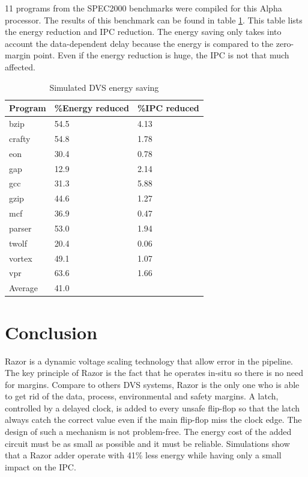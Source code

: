 \documentclass[fleqn,envcountsame,runningheads,10pt,a4paper]{llncs}
\begin{document}
11 programs from the SPEC2000 benchmarks were compiled for this Alpha processor. The results of this benchmark can be found in table \ref{table1}. This table lists the energy reduction and IPC reduction. The energy saving only takes into account the data-dependent delay because the energy is compared to the zero-margin point. Even if the energy reduction is huge, the IPC is not that much affected.
\begin{table}[t]
\centering
    \caption{\label{table1} Simulated DVS energy saving}
    \begin{tabular}{|l|l|l|}
        \hline
        Program & \%Energy reduced & \%IPC reduced \\ \hline
        bzip    & 54.5            & 4.13         \\ 
        crafty  & 54.8            & 1.78         \\ 
        eon     & 30.4            & 0.78         \\ 
        gap     & 12.9            & 2.14         \\ 
        gcc     & 31.3            & 5.88         \\ 
        gzip    & 44.6            & 1.27         \\ 
        mcf     & 36.9            & 0.47         \\ 
        parser  & 53.0            & 1.94         \\ 
        twolf   & 20.4            & 0.06         \\ 
        vortex  & 49.1            & 1.07         \\ 
        vpr     & 63.6            & 1.66         \\ 
        Average & 41.0            & ~            \\
        \hline
    \end{tabular}
\end{table}

\section{Conclusion}
Razor is a dynamic voltage scaling technology that allow error in the pipeline. The key principle of Razor is the fact that he operates in-situ so there is no need for margins. Compare to others DVS systems, Razor is the only one who is able to get rid of the data, process, environmental and safety margins. A latch, controlled by a delayed clock, is added to every unsafe flip-flop so that the latch always catch the correct value even if the main flip-flop miss the clock edge. The design of such a mechanism is not problem-free. The energy cost of the added circuit must be as small as possible and it must be reliable. Simulations show that a Razor adder operate with 41\% less energy while having only a small impact on the IPC. 


\end{document}
